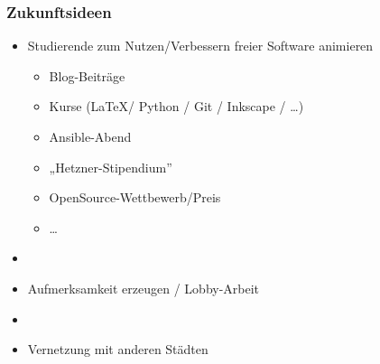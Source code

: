 \documentclass[t]{beamer}
\begin{document}
\begin{frame}[label=ct3]
  \frametitle{Zukunftsideen}

  \begin{itemize}
  \item Studierende zum Nutzen/Verbessern freier Software animieren
    \begin{itemize}
    \item Blog-Beiträge
    \item Kurse (\LaTeX / Python / Git / Inkscape / \dots)
    \item Ansible-Abend
    \item „Hetzner-Stipendium”
    \item OpenSource-Wettbewerb/Preis
    \item \dots
    \end{itemize}

  \item[]
  \item Aufmerksamkeit erzeugen / Lobby-Arbeit
  \item[]
  \item Vernetzung mit anderen Städten

  \end{itemize}

\end{frame}
\end{document}
